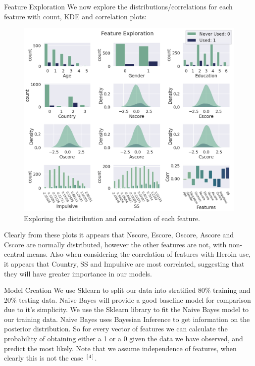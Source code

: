 \documentclass[6pt, final, xcolor=table]{beamer}
\newlength{\colwidth}
\begin{document}
\begin{frame}[t]
\begin{columns}[t]
\begin{column}{\colwidth}
  \begin{block}{Feature Exploration}
    We now explore the distributions/correlations for each feature with count, KDE and correlation
    plots:
  \begin{figure}[h!]
    \centering
     \includegraphics[scale=0.9]{feature_plots.png}
    \caption{Exploring the distribution and correlation of each feature.}
    \label{fig:feature_plots}
    \end{figure}
    Clearly from these plots it appears that Nscore, Escore, Oscore, Ascore and Cscore
    are normally distributed, however the other features are not, with non-central means.
    Also when considering the correlation of features with Heroin use, it appears that Country, SS and Impulsive are most correlated, suggesting that they will have greater importance in our models.

  \end{block}

\begin{block}{Model Creation}
We use Sklearn to split our data into stratified 80\% training and 20\% testing data.
Naive Bayes will provide a good baseline model for comparison due to it's simplicity. 
We use the Sklearn library to fit the Naive Bayes model to our training data.
Naive Bayes uses Bayesian Inference to get information on the posterior 
distribution. So for every vector of features we can calculate the probability of obtaining
either a 1 or a 0 given the data we have observed, and predict the most likely. Note that we assume independence of features, when clearly this is not the case $^{[4]}$.


\end{block}
\end{column}
\end{columns}
\end{frame}
\end{document}
